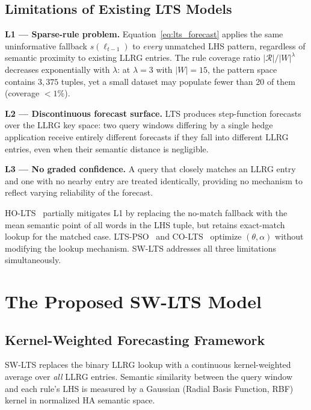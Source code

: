 \documentclass[conference]{IEEEtran}
\begin{document}
\subsection{Limitations of Existing LTS Models}

\textbf{L1 — Sparse-rule problem.}
Equation~\eqref{eq:lts_forecast} applies the same uninformative
fallback $s(\ell_{t-1})$ to \emph{every} unmatched LHS pattern,
regardless of semantic proximity to existing LLRG entries. The rule
coverage ratio $|\mathcal{R}|/|W|^\lambda$ decreases exponentially
with $\lambda$: at $\lambda=3$ with $|W|=15$, the pattern space
contains $3{,}375$ tuples, yet a small dataset may populate fewer
than 20 of them (coverage $< 1\%$).

\textbf{L2 — Discontinuous forecast surface.}
LTS produces step-function forecasts over the LLRG key space: two
query windows differing by a single hedge application receive entirely
different forecasts if they fall into different LLRG entries, even
when their semantic distance is negligible.

\textbf{L3 — No graded confidence.}
A query that closely matches an LLRG entry and one with no nearby
entry are treated identically, providing no mechanism to reflect
varying reliability of the forecast.

HO-LTS~\cite{hieu2021holts} partially mitigates L1 by replacing the
no-match fallback with the mean semantic point of all words in the LHS
tuple, but retains exact-match lookup for the matched case.
LTS-PSO~\cite{hieu2022ltspso} and CO-LTS~\cite{hieu2023colts} optimize
$(\theta, \alpha)$ without modifying the lookup mechanism. SW-LTS
addresses all three limitations simultaneously.

\section{The Proposed SW-LTS Model}
\label{sec:method}

\subsection{Kernel-Weighted Forecasting Framework}

SW-LTS replaces the binary LLRG lookup with a continuous
kernel-weighted average over \emph{all} LLRG entries. Semantic
similarity between the query window and each rule's LHS is measured
by a Gaussian (Radial Basis Function, RBF) kernel in normalized HA
semantic space.
\end{document}
